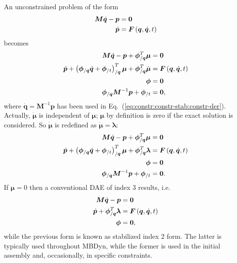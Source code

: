 \documentclass[10pt,fleqn,subeqn]{report}
\newcommand{\T}[1]{\bm{#1}}
\newcommand{\TT}[1]{\bm{#1}}
\begin{document}
An unconstrained problem of the form
\begin{subequations}
\begin{align}
	\T{M} \dot{\T{q}} - \T{p} &= \T{0} \\
	\dot{\T{p}} &= \T{F}\plbr{\T{q}, \dot{\T{q}}, t}
\end{align}
\end{subequations}
becomes
\begin{subequations}
\begin{align}
	\T{M} \dot{\T{q}} - \T{p} + \T{\phi}_{/\T{q}}^T \T{\mu} &= \T{0} \\
	\dot{\T{p}} + \plbr{
		\T{\phi}_{/\T{q}} \dot{\T{q}}
		+ \T{\phi}_{/t}
	}_{/\T{q}}^T \T{\mu}
	+ \T{\phi}_{/\T{q}}^T \dot{\T{\mu}} &= \T{F}\plbr{\T{q}, \dot{\T{q}}, t} \\
	\T{\phi} &= \T{0} \\
	\T{\phi}_{/\T{q}} \TT{M}^{-1} \T{p} + \T{\phi}_{/t} &= \T{0} \label{eq:constr:constr-stab:constr-der},
\end{align}
\end{subequations}
where $\dot{\T{q}}=\TT{M}^{-1}\T{p}$ has been used
in Eq.~(\ref{eq:constr:constr-stab:constr-der}).
Actually, $\dot{\T{\mu}}$ is independent of $\T{\mu}$;
$\T{\mu}$ by definition is zero if the exact solution is considered.
So $\dot{\T{\mu}}$ is redefined as $\dot{\T{\mu}}=\T{\lambda}$:
\begin{subequations}
\begin{align}
	\T{M} \dot{\T{q}} - \T{p} + \T{\phi}_{/\T{q}}^T \T{\mu} &= \T{0} \\
	\dot{\T{p}} + \plbr{
		\T{\phi}_{/\T{q}} \dot{\T{q}}
		+ \T{\phi}_{/t}
	}_{/\T{q}}^T \T{\mu} + \T{\phi}_{/\T{q}}^T \T{\lambda}
		&= \T{F}\plbr{\T{q}, \dot{\T{q}}, t} \\
	\T{\phi} &= \T{0} \\
	\T{\phi}_{/\T{q}} \TT{M}^{-1} \T{p} + \T{\phi}_{/t} &= \T{0} .
\end{align}
\end{subequations}
If $\T{\mu}=0$ then a conventional DAE of index 3 results, i.e.
\begin{subequations}
\begin{align}
	\T{M} \dot{\T{q}} - \T{p} &= \T{0} \\
	\dot{\T{p}} + \T{\phi}_{/\T{q}}^T \T{\lambda}
		&= \T{F}\plbr{\T{q}, \dot{\T{q}}, t} \\
	\T{\phi} &= \T{0} ,
\end{align}
\end{subequations}
while the previous form is known as stabilized index 2 form.
The latter is typically used throughout MBDyn, while the former is used 
in the initial assembly and, occasionally, in specific constraints.
\end{document}
